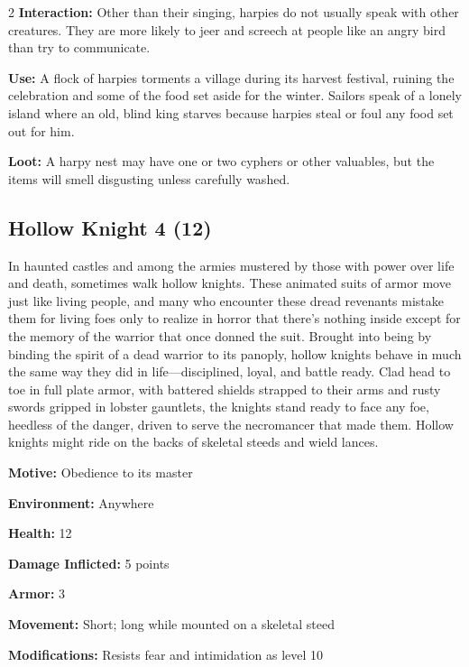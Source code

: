 \begin{multicols}{2}
\textbf{Interaction:} Other than their singing, harpies do not usually speak with other creatures. They are more likely to jeer and screech at people like an angry bird than try to communicate. 

\textbf{Use:} A flock of harpies torments a village during its harvest festival, ruining the celebration and some of the food set aside for the winter. Sailors speak of a lonely island where an old, blind king starves because harpies steal or foul any food set out for him. 

\textbf{Loot:} A harpy nest may have one or two cyphers or other valuables, but the items will smell disgusting unless carefully washed.

\subsection{Hollow Knight 4 (12)}

In haunted castles and among the armies mustered by those with power over life and death, sometimes walk hollow knights. These animated suits of armor move just like living people, and many who encounter these dread revenants mistake them for living foes only to realize in horror that there’s nothing inside except for the memory of the warrior that once donned the suit. Brought into being by binding the spirit of a dead warrior to its panoply, hollow knights behave in much the same way they did in life—disciplined, loyal, and battle ready. Clad head to toe in full plate armor, with battered shields strapped to their arms and rusty swords gripped in lobster gauntlets, the knights stand ready to face any foe, heedless of the danger, driven to serve the necromancer that made them. Hollow knights might ride on the backs of skeletal steeds and wield lances. 

\textbf{Motive:} Obedience to its master 

\textbf{Environment:} Anywhere 

\textbf{Health:} 12 

\textbf{Damage Inflicted:} 5 points 

\textbf{Armor:} 3 

\textbf{Movement:} Short; long while mounted on a skeletal steed 

\textbf{Modifications:} Resists fear and intimidation as level 10 


\end{multicols}
